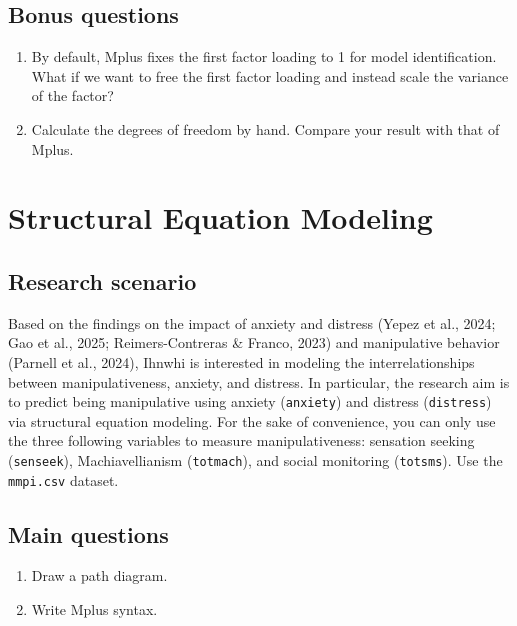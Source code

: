 \documentclass[
]{book}
\begin{document}
\section{Bonus questions}\label{bonus-questions-1}

\begin{enumerate}
\def\labelenumi{\arabic{enumi}.}
\item
  By default, Mplus fixes the first factor loading to 1 for model identification. What if we want to free the first factor loading and instead scale the variance of the factor?
\item
  Calculate the degrees of freedom by hand. Compare your result with that of Mplus.
\end{enumerate}

\chapter{Structural Equation Modeling}\label{structural-equation-modeling}

\section{Research scenario}\label{research-scenario-2}

Based on the findings on the impact of anxiety and distress (Yepez et al., 2024; Gao et al., 2025; Reimers-Contreras \& Franco, 2023) and manipulative behavior (Parnell et al., 2024), Ihnwhi is interested in modeling the interrelationships between manipulativeness, anxiety, and distress. In particular, the research aim is to predict being manipulative using anxiety (\texttt{anxiety}) and distress (\texttt{distress}) via structural equation modeling. For the sake of convenience, you can only use the three following variables to measure manipulativeness: sensation seeking (\texttt{senseek}), Machiavellianism (\texttt{totmach}), and social monitoring (\texttt{totsms}). Use the \texttt{mmpi.csv} dataset.

\section{Main questions}\label{main-questions-2}

\begin{enumerate}
\def\labelenumi{\arabic{enumi}.}
\item
  Draw a path diagram.
\item
  Write Mplus syntax.
\end{enumerate}
\end{document}
